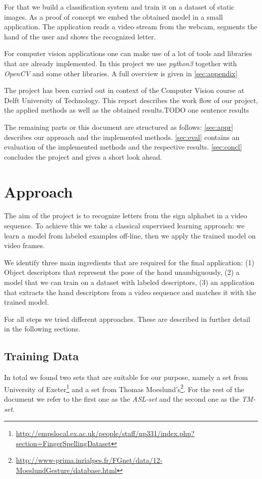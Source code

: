 \documentclass[letterpaper, 10 pt, conference]{ieeeconf}  %
\begin{document}
For that we build a classification system and train it on a dataset of static images. As a proof of concept we embed the obtained model in a small application. The application reads a video stream from the webcam, segments the hand of the user and shows the recognized letter.

For computer vision applications one can make use of a lot of tools and libraries that are already implemented. In this project we use \textit{python3} together with \textit{OpenCV} and some other libraries. A full overview is given in \autoref{sec:appendix} 

The project has been carried out in context of the Computer Vision course at Delft University of Technology. This report describes the work flow of our project, the applied methods as well as the obtained results.TODO one sentence results

The remaining parts or this document are structured as follows: \autoref{sec:appr} describes our approach and the implemented methods. \autoref{sec:eval} contains an evaluation of the implemented methods and the respective results. \autoref{sec:concl} concludes the project and gives a short look ahead.


\section{Approach}
\label{sec:appr}
The aim of the project is to recognize letters from the sign alphabet in a video sequence. To achieve this we take a classical supervised learning approach: we learn a model from labeled examples off-line, then we apply the trained model on video frames.

We identify three main ingredients that are required for the final application: (1) Object descriptors that represent the pose of the hand unambiguously, (2) a model that we can train on a dataset with labeled descriptors, (3) an application that extracts the hand descriptors from a video sequence and matches it with the trained model.

For all steps we tried different approaches. These are described in further detail in the following sections. 

\subsection{Training Data}

In total we found two sets that are suitable for our purpose, namely a set from University of Exeter\footnote{\url{http://empslocal.ex.ac.uk/people/staff/np331/index.php?section=FingerSpellingDataset}} and a set from Thomas Moeslund's\footnote{\url{http://www-prima.inrialpes.fr/FGnet/data/12-MoeslundGesture/database.html}}. For the rest of the document we refer to the first one as the \textit{ASL-set} and the second one as the \textit{TM-set}.
\end{document}
